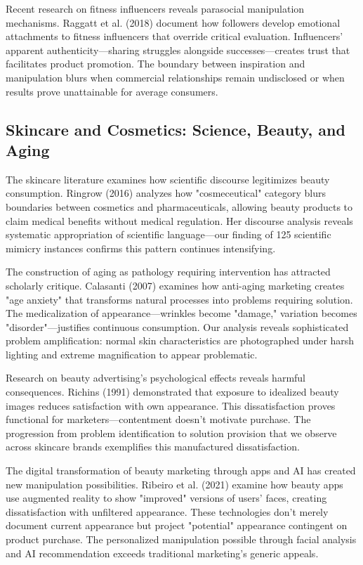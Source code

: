 Recent research on fitness influencers reveals parasocial manipulation mechanisms. Raggatt et al. (2018) document how followers develop emotional attachments to fitness influencers that override critical evaluation. Influencers' apparent authenticity—sharing struggles alongside successes—creates trust that facilitates product promotion. The boundary between inspiration and manipulation blurs when commercial relationships remain undisclosed or when results prove unattainable for average consumers.

\subsection{Skincare and Cosmetics: Science, Beauty, and Aging}

The skincare literature examines how scientific discourse legitimizes beauty consumption. Ringrow (2016) analyzes how "cosmeceutical" category blurs boundaries between cosmetics and pharmaceuticals, allowing beauty products to claim medical benefits without medical regulation. Her discourse analysis reveals systematic appropriation of scientific language—our finding of 125 scientific mimicry instances confirms this pattern continues intensifying.

The construction of aging as pathology requiring intervention has attracted scholarly critique. Calasanti (2007) examines how anti-aging marketing creates "age anxiety" that transforms natural processes into problems requiring solution. The medicalization of appearance—wrinkles become "damage," variation becomes "disorder"—justifies continuous consumption. Our analysis reveals sophisticated problem amplification: normal skin characteristics are photographed under harsh lighting and extreme magnification to appear problematic.

Research on beauty advertising's psychological effects reveals harmful consequences. Richins (1991) demonstrated that exposure to idealized beauty images reduces satisfaction with own appearance. This dissatisfaction proves functional for marketers—contentment doesn't motivate purchase. The progression from problem identification to solution provision that we observe across skincare brands exemplifies this manufactured dissatisfaction.

The digital transformation of beauty marketing through apps and AI has created new manipulation possibilities. Ribeiro et al. (2021) examine how beauty apps use augmented reality to show "improved" versions of users' faces, creating dissatisfaction with unfiltered appearance. These technologies don't merely document current appearance but project "potential" appearance contingent on product purchase. The personalized manipulation possible through facial analysis and AI recommendation exceeds traditional marketing's generic appeals.

